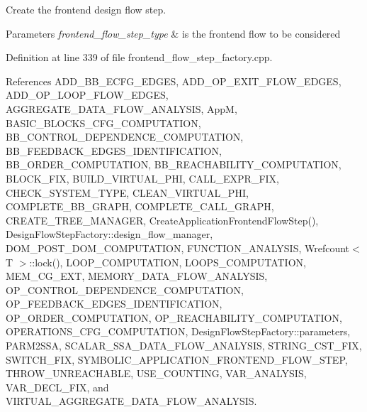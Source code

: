 Create the frontend design flow step. 


\begin{DoxyParams}{Parameters}
{\em frontend\+\_\+flow\+\_\+step\+\_\+type} & is the frontend flow to be considered \\
\hline
\end{DoxyParams}


Definition at line 339 of file frontend\+\_\+flow\+\_\+step\+\_\+factory.\+cpp.



References A\+D\+D\+\_\+\+B\+B\+\_\+\+E\+C\+F\+G\+\_\+\+E\+D\+G\+ES, A\+D\+D\+\_\+\+O\+P\+\_\+\+E\+X\+I\+T\+\_\+\+F\+L\+O\+W\+\_\+\+E\+D\+G\+ES, A\+D\+D\+\_\+\+O\+P\+\_\+\+L\+O\+O\+P\+\_\+\+F\+L\+O\+W\+\_\+\+E\+D\+G\+ES, A\+G\+G\+R\+E\+G\+A\+T\+E\+\_\+\+D\+A\+T\+A\+\_\+\+F\+L\+O\+W\+\_\+\+A\+N\+A\+L\+Y\+S\+IS, AppM, B\+A\+S\+I\+C\+\_\+\+B\+L\+O\+C\+K\+S\+\_\+\+C\+F\+G\+\_\+\+C\+O\+M\+P\+U\+T\+A\+T\+I\+ON, B\+B\+\_\+\+C\+O\+N\+T\+R\+O\+L\+\_\+\+D\+E\+P\+E\+N\+D\+E\+N\+C\+E\+\_\+\+C\+O\+M\+P\+U\+T\+A\+T\+I\+ON, B\+B\+\_\+\+F\+E\+E\+D\+B\+A\+C\+K\+\_\+\+E\+D\+G\+E\+S\+\_\+\+I\+D\+E\+N\+T\+I\+F\+I\+C\+A\+T\+I\+ON, B\+B\+\_\+\+O\+R\+D\+E\+R\+\_\+\+C\+O\+M\+P\+U\+T\+A\+T\+I\+ON, B\+B\+\_\+\+R\+E\+A\+C\+H\+A\+B\+I\+L\+I\+T\+Y\+\_\+\+C\+O\+M\+P\+U\+T\+A\+T\+I\+ON, B\+L\+O\+C\+K\+\_\+\+F\+IX, B\+U\+I\+L\+D\+\_\+\+V\+I\+R\+T\+U\+A\+L\+\_\+\+P\+HI, C\+A\+L\+L\+\_\+\+E\+X\+P\+R\+\_\+\+F\+IX, C\+H\+E\+C\+K\+\_\+\+S\+Y\+S\+T\+E\+M\+\_\+\+T\+Y\+PE, C\+L\+E\+A\+N\+\_\+\+V\+I\+R\+T\+U\+A\+L\+\_\+\+P\+HI, C\+O\+M\+P\+L\+E\+T\+E\+\_\+\+B\+B\+\_\+\+G\+R\+A\+PH, C\+O\+M\+P\+L\+E\+T\+E\+\_\+\+C\+A\+L\+L\+\_\+\+G\+R\+A\+PH, C\+R\+E\+A\+T\+E\+\_\+\+T\+R\+E\+E\+\_\+\+M\+A\+N\+A\+G\+ER, Create\+Application\+Frontend\+Flow\+Step(), Design\+Flow\+Step\+Factory\+::design\+\_\+flow\+\_\+manager, D\+O\+M\+\_\+\+P\+O\+S\+T\+\_\+\+D\+O\+M\+\_\+\+C\+O\+M\+P\+U\+T\+A\+T\+I\+ON, F\+U\+N\+C\+T\+I\+O\+N\+\_\+\+A\+N\+A\+L\+Y\+S\+IS, Wrefcount$<$ T $>$\+::lock(), L\+O\+O\+P\+\_\+\+C\+O\+M\+P\+U\+T\+A\+T\+I\+ON, L\+O\+O\+P\+S\+\_\+\+C\+O\+M\+P\+U\+T\+A\+T\+I\+ON, M\+E\+M\+\_\+\+C\+G\+\_\+\+E\+XT, M\+E\+M\+O\+R\+Y\+\_\+\+D\+A\+T\+A\+\_\+\+F\+L\+O\+W\+\_\+\+A\+N\+A\+L\+Y\+S\+IS, O\+P\+\_\+\+C\+O\+N\+T\+R\+O\+L\+\_\+\+D\+E\+P\+E\+N\+D\+E\+N\+C\+E\+\_\+\+C\+O\+M\+P\+U\+T\+A\+T\+I\+ON, O\+P\+\_\+\+F\+E\+E\+D\+B\+A\+C\+K\+\_\+\+E\+D\+G\+E\+S\+\_\+\+I\+D\+E\+N\+T\+I\+F\+I\+C\+A\+T\+I\+ON, O\+P\+\_\+\+O\+R\+D\+E\+R\+\_\+\+C\+O\+M\+P\+U\+T\+A\+T\+I\+ON, O\+P\+\_\+\+R\+E\+A\+C\+H\+A\+B\+I\+L\+I\+T\+Y\+\_\+\+C\+O\+M\+P\+U\+T\+A\+T\+I\+ON, O\+P\+E\+R\+A\+T\+I\+O\+N\+S\+\_\+\+C\+F\+G\+\_\+\+C\+O\+M\+P\+U\+T\+A\+T\+I\+ON, Design\+Flow\+Step\+Factory\+::parameters, P\+A\+R\+M2\+S\+SA, S\+C\+A\+L\+A\+R\+\_\+\+S\+S\+A\+\_\+\+D\+A\+T\+A\+\_\+\+F\+L\+O\+W\+\_\+\+A\+N\+A\+L\+Y\+S\+IS, S\+T\+R\+I\+N\+G\+\_\+\+C\+S\+T\+\_\+\+F\+IX, S\+W\+I\+T\+C\+H\+\_\+\+F\+IX, S\+Y\+M\+B\+O\+L\+I\+C\+\_\+\+A\+P\+P\+L\+I\+C\+A\+T\+I\+O\+N\+\_\+\+F\+R\+O\+N\+T\+E\+N\+D\+\_\+\+F\+L\+O\+W\+\_\+\+S\+T\+EP, T\+H\+R\+O\+W\+\_\+\+U\+N\+R\+E\+A\+C\+H\+A\+B\+LE, U\+S\+E\+\_\+\+C\+O\+U\+N\+T\+I\+NG, V\+A\+R\+\_\+\+A\+N\+A\+L\+Y\+S\+IS, V\+A\+R\+\_\+\+D\+E\+C\+L\+\_\+\+F\+IX, and V\+I\+R\+T\+U\+A\+L\+\_\+\+A\+G\+G\+R\+E\+G\+A\+T\+E\+\_\+\+D\+A\+T\+A\+\_\+\+F\+L\+O\+W\+\_\+\+A\+N\+A\+L\+Y\+S\+IS.



